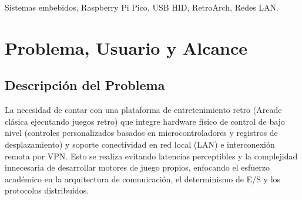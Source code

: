 \documentclass[conference]{IEEEtran}
\begin{document}
\begin{abstract}
	Este documento presenta la propuesta de diseño para una terminal de juego retro distribuida basada en hardware embebido, desarrollada como proyecto final de la asignatura de Sistemas Embebidos. El sistema integra un nodo esclavo (Raspberry Pi Pico) para la adquisición de entradas físicas digitales (mediante registros de desplazamiento $74HC165$) y analógicas (potenciómetro), implementando comunicación USB HID de baja latencia y retroalimentación háptica y visual mediante actuadores. Como nodo maestro, se emplea una Raspberry Pi 4 Model B con 1 GB de RAM corriendo RetroArch sobre Linux Embebido, permitiendo además la sincronización de partidas multijugador en red local (LAN) y preparando una infraestructura extensible para multijugador remoto mediante VPN (WireGuard). Se detallan los requisitos funcionales y no funcionales con criterios de aceptación numéricos, la arquitectura modular mediante diagrama de bloques, la justificación cuantitativa de plataformas y sistemas operativos, la bitácora de decisiones de diseño, la lista de materiales con análisis de riesgos y el plan de trabajo detallado para un equipo de 6 integrantes en un período de 3 semanas.
\end{abstract}

\begin{IEEEkeywords}
	Sistemas embebidos, Raspberry Pi Pico, USB HID, RetroArch, Redes LAN.
\end{IEEEkeywords}

\section{Problema, Usuario y Alcance}

\subsection{Descripción del Problema}

La necesidad de contar con una plataforma de entretenimiento retro (Arcade clásica ejecutando juegos retro) que integre hardware físico de control de bajo nivel (controles personalizados basados en microcontroladores y registros de desplazamiento) y soporte conectividad en red local (LAN) e interconexión remota por VPN. Esto se realiza evitando latencias perceptibles y la complejidad innecesaria de desarrollar motores de juego propios, enfocando el esfuerzo académico en la arquitectura de comunicación, el determinismo de E/S y los protocolos distribuidos.
\end{document}
